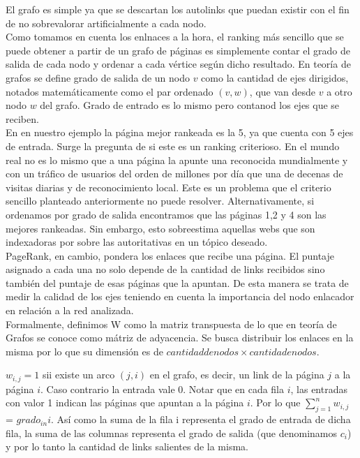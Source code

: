 El grafo es simple ya que se descartan los autolinks que puedan existir con el fin de no sobrevalorar artificialmente a cada nodo.\\

Como tomamos en cuenta los enlnaces a la hora, el ranking más sencillo que se puede obtener a partir de un grafo de páginas es simplemente contar el grado de salida de cada nodo y ordenar a cada vértice según dicho resultado. En teoría de grafos se define grado de salida de un nodo $v$ como la cantidad de ejes dirigidos, notados matemáticamente como el par ordenado $(v,w)$, que van desde $v$ a otro nodo $w$ del grafo. Grado de entrado es lo mismo pero contanod los ejes que se reciben. 
\\

En en nuestro ejemplo la página mejor rankeada es la 5, ya que cuenta con 5 ejes de entrada. Surge la pregunta de si este es un ranking criterioso. En el mundo real no es lo mismo que a una página la apunte una reconocida mundialmente y con un tráfico de usuarios del orden de millones por día que una de decenas de visitas diarias y de reconocimiento local. Este es un problema que el criterio sencillo planteado anteriormente no puede resolver.
Alternativamente, si ordenamos por grado de salida encontramos que las páginas 1,2 y 4 son las mejores rankeadas. Sin embargo, esto sobreestima aquellas webs que son indexadoras por sobre las autoritativas en un tópico deseado.\\

PageRank, en cambio, pondera los enlaces que recibe una página. El puntaje asignado a cada una no solo depende de la cantidad de links recibidos sino también del puntaje de esas páginas que la apuntan. De esta manera se trata de medir la calidad de los ejes teniendo en cuenta la importancia del nodo enlacador en relación a la red analizada.\\

Formalmente, definimos W como la matriz transpuesta de lo que en teoría de Grafos se conoce como mátriz de adyacencia.
Se busca distribuir los enlaces en la misma por lo que su dimensión es de $cantidad de nodos \times cantida de nodos$.

$w_{i,j} = 1$ sii existe un arco $(j,i)$ en el grafo, es decir, un link de la página $j$ a la página $i$. Caso contrario la entrada vale 0. Notar que en cada fila $i$, las entradas con valor 1 indican las páginas que apuntan a la página $i$. Por lo que $\sum_{j=1}^{n} w_{i,j}$ = $grado_{in} i$. Así como la suma de la fila i representa el grado de entrada de dicha fila, la suma de las columnas representa el grado de salida (que denominamos $c_{i}$) y por lo tanto la cantidad de links salientes de la misma. \\

